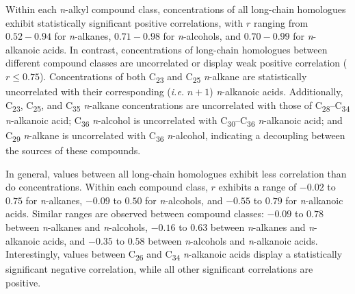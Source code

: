 Within each \textit{n}-alkyl compound class, concentrations of all long-chain homologues exhibit statistically significant positive correlations, with $r$ ranging from $0.52 - 0.94$ for \textit{n}-alkanes, $0.71 - 0.98$ for \textit{n}-alcohols, and $0.70 - 0.99$ for \textit{n}-alkanoic acids. In contrast, concentrations of long-chain homologues between different compound classes are uncorrelated or display weak positive correlation ($r \leq 0.75$). Concentrations of both C\textsubscript{23} and C\textsubscript{25} \textit{n}-alkane are statistically uncorrelated with their corresponding (\textit{i.e.} $n + 1$) \textit{n}-alkanoic acids. Additionally, C\textsubscript{23}, C\textsubscript{25}, and C\textsubscript{35} \textit{n}-alkane concentrations are uncorrelated with those of C\textsubscript{28}--C\textsubscript{34} \textit{n}-alkanoic acid; C\textsubscript{36} \textit{n}-alcohol is uncorrelated with C\textsubscript{30}--C\textsubscript{36} \textit{n}-alkanoic acid; and C\textsubscript{29} \textit{n}-alkane is uncorrelated with C\textsubscript{36} \textit{n}-alcohol, indicating a decoupling between the sources of these compounds.

In general,  values between all long-chain homologues exhibit less correlation than do concentrations. Within each compound class, $r$ exhibits a range of $-0.02$ to $0.75$ for \textit{n}-alkanes, $-0.09$ to $0.50$ for \textit{n}-alcohols, and $-0.55$ to $0.79$ for \textit{n}-alkanoic acids. Similar ranges are observed between compound classes: $-0.09$ to $0.78$ between \textit{n}-alkanes and \textit{n}-alcohols, $-0.16$ to $0.63$ between \textit{n}-alkanes and \textit{n}-alkanoic acids, and $-0.35$ to $0.58$ between \textit{n}-alcohols and \textit{n}-alkanoic acids. Interestingly,  values between C\textsubscript{26} and C\textsubscript{34} \textit{n}-alkanoic acids display a statistically significant negative correlation, while all other significant correlations are positive.


